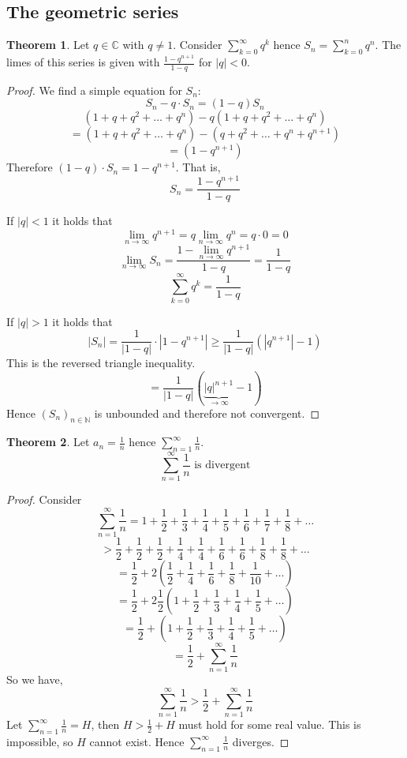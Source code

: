 \documentclass[a4paper,landscape,twocolumn]{article}
\theoremstyle{definition}
\newtheorem{theorem}{Theorem}
\newcommand\abs[1]{\left|#1\right|}
\newcommand\seq[1]{{\left(#1\right)}_{n \in \mathbb N}}
\begin{document}
\subsection{The geometric series}
\begin{theorem}
  Let $q \in \mathbb C$ with $q \neq 1$.
  Consider $\sum_{k=0}^\infty q^k$ hence $S_n = \sum_{k=0}^{n} q^n$.
  The limes of this series is given with $\frac{1 - q^{n+1}}{1 - q}$ for $\abs{q} < 0$.
\end{theorem}
\begin{proof}
  We find a simple equation for $S_n$:
  \[ S_n - q \cdot S_n = (1 - q) S_n \]
  \[ (1 + q + q^2 + \dots + q^n) - q (1 + q + q^2 + \dots + q^n) \]
  \[ = (1 + q + q^2 + \dots + q^n) - (q + q^2 + \dots + q^n + q^{n+1}) \]
  \[ = (1 - q^{n+1}) \]
  Therefore $(1 - q) \cdot S_n = 1 - q^{n+1}$. That is,
  \[ S_n = \frac{1 - q^{n+1}}{1 - q} \]

  If $\abs{q} < 1$ it holds that
  \[ \lim_{n\to\infty} q^{n+1} = q \lim_{n\to\infty} q^n = q \cdot 0 = 0 \]
  \[ \lim_{n\to\infty} S_n = \frac{1 - \lim_{n\to\infty} q^{n+1}}{1 - q} = \frac{1}{1 - q} \]
  \[ \sum_{k=0}^\infty q^k = \frac{1}{1 - q} \]

  If $\abs{q} > 1$ it holds that
  \[
    \abs{S_n}
    = \frac{1}{\abs{1 - q}} \cdot \abs{1 - q^{n+1}}
    \geq \frac{1}{\abs{1 - q}} \left(\abs{q^{n+1}} - 1\right)
  \]
  This is the reversed triangle inequality.
  \[ = \frac{1}{\abs{1 - q}} \left(\underbrace{\abs{q}^{n+1}}_{\to\infty} - 1\right) \]
  Hence $\seq{S_n}$ is unbounded and therefore not convergent.
\end{proof}

\begin{theorem}
  Let $a_n = \frac1n$ hence $\sum_{n=1}^\infty \frac1n$.
  \[ \sum_{n=1}^\infty \frac1n \text{ is divergent} \]
\end{theorem}
\begin{proof}
  Consider
  \[ \sum_{n=1}^\infty \frac1n = 1 + \frac12 + \frac13 + \frac14 + \frac15 + \frac16 + \frac17 + \frac18 + \dots \]
  \[ > \frac12 + \frac12 + \frac12 + \frac14 + \frac14 + \frac16 + \frac16 + \frac18 + \frac18 + \dots \]
  \[ = \frac12 + 2 \left(\frac12 + \frac14 + \frac16 + \frac18 + \frac1{10} + \dots\right) \]
  \[ = \frac12 + 2 \frac12 \left(1 + \frac12 + \frac13 + \frac14 + \frac15 + \dots\right) \]
  \[ = \frac12 + \left(1 + \frac12 + \frac13 + \frac14 + \frac15 + \dots\right) \]
  \[ = \frac12 + \sum_{n=1}^\infty \frac1n \]
  So we have,
  \[ \sum_{n=1}^\infty \frac1n > \frac12 + \sum_{n=1}^\infty \frac1n \]
  Let $\sum_{n=1}^\infty \frac1n = H$, then $H > \frac12 + H$ must hold for some real value.
  This is impossible, so $H$ cannot exist. Hence $\sum_{n=1}^\infty \frac1n$ diverges.
\end{proof}
\end{document}
